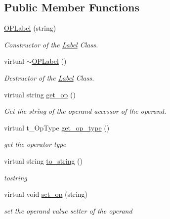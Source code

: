 \subsection*{\-Public \-Member \-Functions}
\begin{DoxyCompactItemize}
\item 
\hypertarget{classOPLabel_a5405b78894658047362a328e750f88b4}{\hyperlink{classOPLabel_a5405b78894658047362a328e750f88b4}{\-O\-P\-Label} (string)}\label{classOPLabel_a5405b78894658047362a328e750f88b4}

\begin{DoxyCompactList}\small\item\em \-Constructor of the \hyperlink{classLabel}{\-Label} \-Class. \end{DoxyCompactList}\item 
\hypertarget{classOPLabel_ab25553d41606e880a622e09d5c09129d}{virtual \hyperlink{classOPLabel_ab25553d41606e880a622e09d5c09129d}{$\sim$\-O\-P\-Label} ()}\label{classOPLabel_ab25553d41606e880a622e09d5c09129d}

\begin{DoxyCompactList}\small\item\em \-Destructor of the \hyperlink{classLabel}{\-Label} \-Class. \end{DoxyCompactList}\item 
\hypertarget{classOPLabel_a1c933d10a7b2267bae3bea6c385d466f}{virtual string \hyperlink{classOPLabel_a1c933d10a7b2267bae3bea6c385d466f}{get\-\_\-op} ()}\label{classOPLabel_a1c933d10a7b2267bae3bea6c385d466f}

\begin{DoxyCompactList}\small\item\em \-Get the string of the operand accessor of the operand. \end{DoxyCompactList}\item 
virtual t\-\_\-\-Op\-Type \hyperlink{classOPLabel_a1a6ec701c549a6475d44ffcced1c23b5}{get\-\_\-op\-\_\-type} ()
\begin{DoxyCompactList}\small\item\em get the operator type \end{DoxyCompactList}\item 
virtual string \hyperlink{classOPLabel_a51c4e8f45422f03edcb71d472cf5e973}{to\-\_\-string} ()
\begin{DoxyCompactList}\small\item\em tostring \end{DoxyCompactList}\item 
\hypertarget{classOPLabel_a189bec8bcf7300e6e8656ce4bb443995}{virtual void \hyperlink{classOPLabel_a189bec8bcf7300e6e8656ce4bb443995}{set\-\_\-op} (string)}\label{classOPLabel_a189bec8bcf7300e6e8656ce4bb443995}

\begin{DoxyCompactList}\small\item\em set the operand value setter of the operand \end{DoxyCompactList}\end{DoxyCompactItemize}


